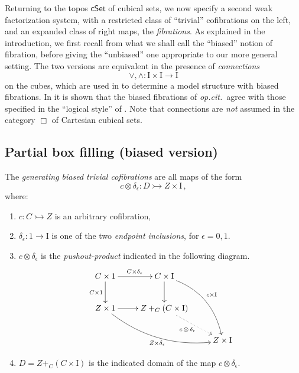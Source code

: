 \documentclass[11pt,reqno]{amsart}
\newcommand{\opcit}{\emph{op.cit.}}
\newcommand{\cSet}{\ensuremath{\mathsf{cSet}}}
\newcommand{\mono}{\ensuremath{\rightarrowtail}}
\newcommand{\ra}{\ensuremath{\rightarrow}}
\newcommand{\too}{\ensuremath{\longrightarrow}}
\newcommand{\I}{\ensuremath{\mathrm{I}}}
\theoremstyle{remark}
\theoremstyle{definition}
\begin{document}
Returning to the topos $\cSet$ of cubical sets, we now specify a second weak factorization system, with a restricted class of ``trivial'' cofibrations on the left, and an expanded class of right maps, the \emph{fibrations}.  As explained in the introduction, we first recall from \cite{GS} what we shall call the ``biased'' notion of fibration, before giving the ``unbiased'' one appropriate to our more general setting.   The two versions are equivalent in the presence of \emph{connections} 
\[
\vee,\wedge : \I\times\I \too \I
\]
 on the cubes, which are used in \cite{Sattler:2017ee} to determine a model structure with biased fibrations.  In \cite{AGH} it is shown that the biased fibrations of \opcit\ agree with those specified in the ``logical style'' of \cite{CCHM:2018ctt,orton-pitts}.    Note that connections are \emph{not} assumed in the category $\Box$ of Cartesian cubical sets.

\subsection*{Partial box filling (biased version)}\label{sec:biasedfibration}

The \emph{generating biased trivial cofibrations} are all maps of the form
\begin{equation}\label{eq:genclassTCof}
c \otimes \delta_\epsilon : D \mono Z\times \I\,,
\end{equation}
where:
\begin{enumerate}
\item  $c : C \mono Z$ is an arbitrary cofibration,

\item $\delta_\epsilon : 1 \ra \I$ is one of the two \emph{endpoint inclusions}, for $\epsilon = 0,1$.

\item $c\otimes\delta_\epsilon$ is the \emph{pushout-product} indicated in the following diagram.
\begin{equation}\label{diagram:pushoutproduct}
\xymatrix{
C\times 1 \ar[d]_{C\times 1} \ar[r]^{C\times \delta_\epsilon} & C\times \I \ar[d] \ar@/^4ex/ [rdd]^{c\times \I}\\
Z\times 1 \ar@/_4ex/ [rrd]_{Z\times \delta_\epsilon} \ar[r] &  Z +_C (C\times\I) \ar@{..>}[rd]_{c\, \otimes\, \delta_\epsilon} \\
&& Z\times\I
}
\end{equation}

\item $D = Z +_C (C\times\I)$ is the indicated domain of the map $c \otimes \delta_\epsilon$.
\end{enumerate}
\end{document}
